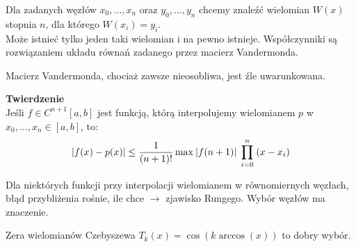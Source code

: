 Dla zadanych węzłów \( x_0, \dots, x_n \) oraz \( y_0, \dots, y_n \) chcemy znaleźć wielomian \( W(x) \) stopnia \( n \), dla którego \( W(x_i) = y_i \). \\
Może istnieć tylko jeden taki wielomian i na pewno istnieje. Współczynniki są rozwiązaniem układu równań zadanego przez macierz Vandermonda.
\begin{warning}
	Macierz Vandermonda, chociaż zawsze nieosobliwa, jest źle uwarunkowana.
\end{warning}

\textbf{Twierdzenie} \\
Jeśli \( f \in C^{n+1}[a, b] \) jest funkcją, którą interpolujemy wielomianem \( p \) w \( x_0, \dots, x_n \in [a, b] \), to:
\[
	\abs{f(x) - p(x)} \leq \frac{1}{(n + 1)!} \max\:\abs{f(n+1)}\; \prod_{i=0}^{n}\; (x - x_i)
\]
\begin{warning}
	Dla niektórych funkcji przy interpolacji wielomianem w równomiernych węzłach, błąd przybliżenia rośnie, ile chce \( \rightarrow \) zjawisko Rungego. Wybór węzłów ma znaczenie.
\end{warning}
Zera wielomianów Czebyszewa \( T_k(x) = \cos(k \arccos(x)) \) to dobry wybór.